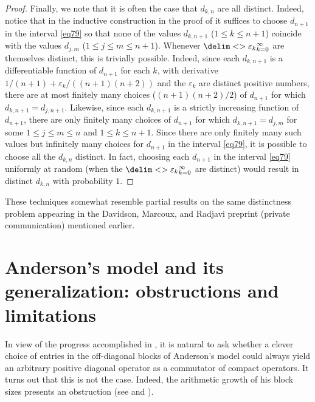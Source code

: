 \documentclass[10pt,reqno]{amsart}
\theoremstyle{remark}
\newcommand{\seq}{\delim<>}
\numberwithin{equation}{section}
\begin{document}
\begin{proof}
  Finally, we note that it is often the case that $d_{k,n}$ are all distinct.
  Indeed, notice that in the inductive construction in the proof of  it suffices to choose $d_{n+1}$ in the interval \eqref{eq79} so that none of the values $d_{k,n+1}$ ($1 \le k \le n+1$) coincide with the values $d_{j,m}$ ($1 \le j \le m \le n+1$).
  Whenever $\seq{\varepsilon_k}_{k=0}^{\infty}$ are themselves distinct, this is trivially possible.
  Indeed, since each $d_{k,n+1}$ is a differentiable function of $d_{n+1}$ for each $k$, with derivative $1/(n+1) + \varepsilon_k/((n+1)(n+2))$ and the $\varepsilon_k$ are distinct positive numbers, there are at most finitely many choices ($(n+1)(n+2)/2$) of $d_{n+1}$ for which $d_{k,n+1} = d_{j,n+1}$.
  Likewise, since each $d_{k,n+1}$ is a strictly increasing function of $d_{n+1}$, there are only finitely many choices of $d_{n+1}$ for which $d_{k,n+1} = d_{j,m}$ for some $1 \le j \le m \le n$ and $1 \le k \le n+1$.
  Since there are only finitely many such values but infinitely many choices for $d_{n+1}$ in the interval \eqref{eq79}, it is possible to choose all the $d_{k,n}$ distinct.
  In fact, choosing each $d_{n+1}$ in the interval \eqref{eq79} uniformly at random (when the $\seq{\varepsilon_k}_{k=0}^{\infty}$ are distinct) would result in distinct $d_{k,n}$ with probability $1$.
\end{proof}

These techniques somewhat resemble partial results on the same distinctness problem appearing in the Davidson, Marcoux, and Radjavi preprint (private communication) \cite{DMR} mentioned earlier.










\section{Anderson's model and its generalization: obstructions and limitations}
\label{sec3a}

In view of the progress accomplished in , it is natural to ask whether a clever choice of entries in the off-diagonal blocks of Anderson's model could always yield an arbitrary positive diagonal operator as a commutator of compact operators.
It turns out that this is not the case.
Indeed, the arithmetic growth of his block sizes presents an obstruction (see  and ).
\end{document}
